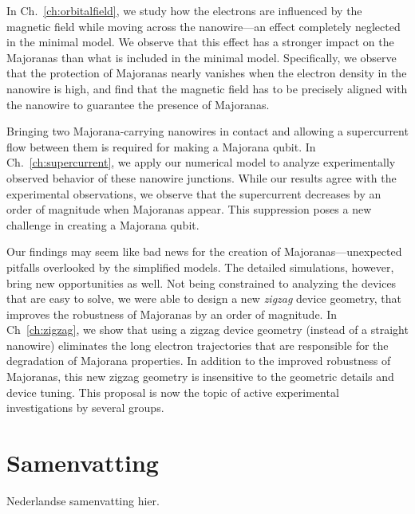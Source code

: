 In Ch.~\ref{ch:orbitalfield}, we study how the electrons are influenced by the magnetic field while moving across the nanowire---an effect completely neglected in the minimal model.
We observe that this effect has a stronger impact on the Majoranas than what is included in the minimal model.
Specifically, we observe that the protection of Majoranas nearly vanishes when the electron density in the nanowire is high, and find that the magnetic field has to be precisely aligned with the nanowire to guarantee the presence of Majoranas.

Bringing two Majorana-carrying nanowires in contact and allowing a supercurrent flow between them is required for making a Majorana qubit.
In Ch.~\ref{ch:supercurrent}, we apply our numerical model to analyze experimentally observed behavior of these nanowire junctions.
While our results agree with the experimental observations, we observe that the supercurrent decreases by an order of magnitude when Majoranas appear.
This suppression poses a new challenge in creating a Majorana qubit.

Our findings may seem like bad news for the creation of Majoranas---unexpected pitfalls overlooked by the simplified models.
The detailed simulations, however, bring new opportunities as well.
Not being constrained to analyzing the devices that are easy to solve, we were able to design a new \emph{zigzag} device geometry, that improves the robustness of Majoranas by an order of magnitude.
In Ch~\ref{ch:zigzag}, we show that using a zigzag device geometry (instead of a straight nanowire) eliminates the long electron trajectories that are responsible for the degradation of Majorana properties.
In addition to the improved robustness of Majoranas, this new zigzag geometry is insensitive to the geometric details and device tuning.
This proposal is now the topic of active experimental investigations by several groups.

\chapter*{Samenvatting}
{

Nederlandse samenvatting hier.

}